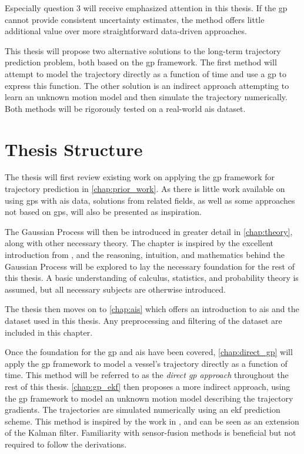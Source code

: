 Especially question 3 will receive emphasized attention in this thesis. If the \acrshort{gp} cannot provide consistent uncertainty estimates, the method offers little additional value over more straightforward data-driven approaches. 


This thesis will propose two alternative solutions to the long-term trajectory prediction problem, both based on the \acrshort{gp} framework. The first method will attempt to model the trajectory directly as a function of time and use a \acrshort{gp} to express this function. The other solution is an indirect approach attempting to learn an unknown motion model and then simulate the trajectory numerically. Both methods will be rigorously tested on a real-world \acrshort{ais} dataset.

\section{Thesis Structure}
The thesis will first review existing work on applying the \acrshort{gp} framework for trajectory prediction in \cref{chap:prior_work}. As there is little work available on using \acrshort{gp}s with \acrshort{ais} data, solutions from related fields, as well as some approaches not based on \acrshort{gp}s, will also be presented as inspiration. 

The Gaussian Process will then be introduced in greater detail in \cref{chap:theory}, along with other necessary theory. The chapter is inspired by the excellent introduction from \cite{rasmussen}, and the reasoning, intuition, and mathematics behind the Gaussian Process will be explored to lay the necessary foundation for the rest of this thesis. A basic understanding of calculus, statistics, and probability theory is assumed, but all necessary subjects are otherwise introduced.  

The thesis then moves on to \cref{chap:ais} which offers an introduction to \acrshort{ais} and the dataset used in this thesis. Any preprocessing and filtering of the dataset are included in this chapter.

Once the foundation for the \acrshort{gp} and \acrshort{ais} have been covered, \cref{chap:direct_gp} will apply the \acrshort{gp} framework to model a vessel's trajectory directly as a function of time. This method will be referred to as the \textit{direct \acrshort{gp} approach} throughout the rest of this thesis.
\cref{chap:gp_ekf} then proposes a more indirect approach, using the \acrshort{gp} framework to model an unknown motion model describing the trajectory gradients. The trajectories are simulated numerically using an \acrshort{ekf} prediction scheme. This method is inspired by the work in \cite{pedestrian,gpekf}, and can be seen as an extension of the Kalman filter. Familiarity with sensor-fusion methods is beneficial but not required to follow the derivations.

